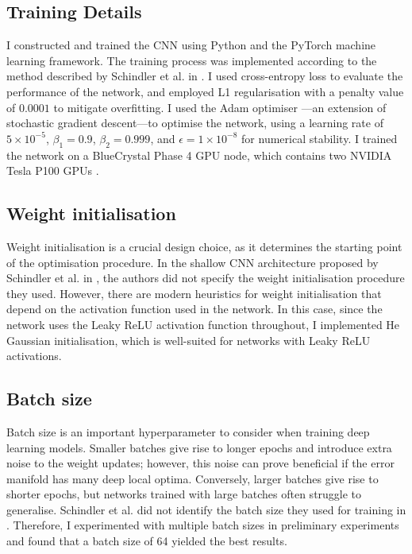 \documentclass[conference]{IEEEtran}
\begin{document}
\subsection{Training Details}

I constructed and trained the CNN using Python and the PyTorch \cite{PyTorch} machine learning framework.
The training process was implemented according to the method described by Schindler et al. in \cite{SchindlerLidyRauber}.
I used cross-entropy loss to evaluate the performance of the network, and employed L1 regularisation with a penalty value of $0.0001$ to mitigate overfitting.
I used the Adam optimiser \cite{KingmaBa}---an extension of stochastic gradient descent---to optimise the network, using a learning rate of $5\times10^{-5}$, $\beta_1=0.9$, $\beta_2=0.999$, and $\epsilon=1\times10^{-8}$ for numerical stability.
I trained the network on a BlueCrystal Phase 4 GPU node, which contains two NVIDIA Tesla P100 GPUs \cite{bc4}.

\subsection{Weight initialisation}

Weight initialisation is a crucial design choice, as it determines the starting point of the optimisation procedure.
In the shallow CNN architecture proposed by Schindler et al. in \cite{SchindlerLidyRauber}, the authors did not specify the weight initialisation procedure they used.
However, there are modern heuristics for weight initialisation that depend on the activation function used in the network.
In this case, since the network uses the Leaky ReLU activation function throughout, I implemented He Gaussian initialisation, which is well-suited for networks with Leaky ReLU activations.

\subsection{Batch size}

Batch size is an important hyperparameter to consider when training deep learning models.
Smaller batches give rise to longer epochs and introduce extra noise to the weight updates; however, this noise can prove beneficial if the error manifold has many deep local optima.
Conversely, larger batches give rise to shorter epochs, but networks trained with large batches often struggle to generalise.
Schindler et al. did not identify the batch size they used for training in \cite{SchindlerLidyRauber}.
Therefore, I experimented with multiple batch sizes in preliminary experiments and found that a batch size of 64 yielded the best results.
\end{document}
